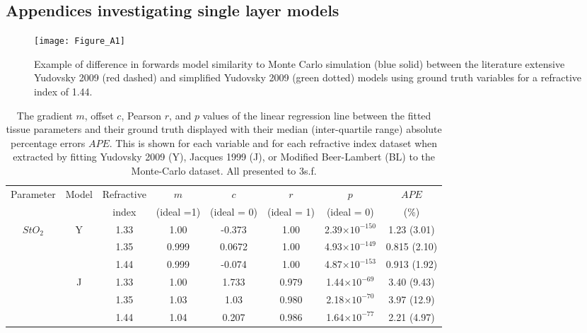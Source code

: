 \begin{subappendices}
    \section{Appendices investigating single layer models}
\begin{figure}[htb!]
    \centering
    \texttt{[image: Figure\_A1]}
    \caption{Example of difference in forwards model similarity to Monte Carlo simulation (blue solid) between the literature extensive Yudovsky 2009 (red dashed) and simplified Yudovsky 2009 (green dotted) models using ground truth variables for a refractive index of 1.44.}
 \label{fig:badYudovsky}
\end{figure}

\begin{table}[htb!]
    \centering
    \caption{The gradient $m$, offset $c$, Pearson $r$, and $p$ values of the linear regression line between the fitted tissue parameters and their ground truth displayed with their median (inter-quartile range) absolute percentage errors $APE$. This is shown for each variable and for each refractive index dataset when extracted by fitting Yudovsky 2009 (Y), Jacques 1999 (J), or Modified Beer-Lambert (BL) to the Monte-Carlo dataset. All presented to 3s.f.}
    \begin{tabular}{|ccc|ccccc|}
        \hline
        Parameter & Model & Refractive & $m$ & $c$ & $r$ & $p$ & $APE$ \\
        & & index & (ideal =1) & (ideal = 0) & (ideal = 1) & (ideal = 0) & (\%)\\
        \hline
        \multirow{9}{*}{$StO_2$} & \multirow{3}{*}{Y} & 1.33 & 1.00 & -0.373 & 1.00 & 2.39$\times 10^{-150}$ & 1.23 (3.01) \\
        & & 1.35 & 0.999 & 0.0672 & 1.00 & 4.93$\times 10^{-149}$ & 0.815 (2.10) \\
        & & 1.44 & 0.999 & -0.074 & 1.00 & 4.87$\times 10^{-153}$ & 0.913 (1.92) \\
        \cline{2-8}
        & \multirow{3}{*}{J} & 1.33 & 1.00 & 1.733 & 0.979 & 1.44$\times 10^{-69}$ & 3.40 (9.43) \\
        & & 1.35 & 1.03 & 1.03 & 0.980 & 2.18$\times 10^{-70}$ & 3.97 (12.9) \\
        & & 1.44 &  1.04 & 0.207 & 0.986 & 1.64$\times 10^{-77}$ & 2.21 (4.97) \\

\end{tabular}
\end{table}
\end{subappendices}
